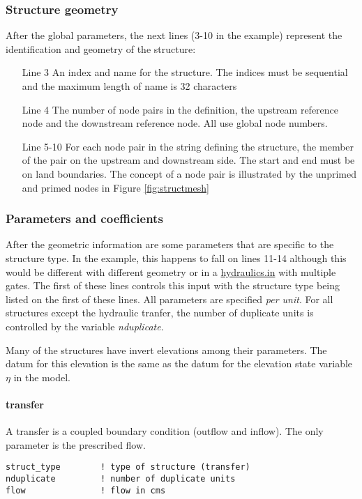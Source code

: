 \subsubsection{Structure geometry}
After the global parameters, the next lines (3-10 in the example) represent the identification and geometry of the structure:
\begin{enumerate}
\item [Line 3] An index and name for the structure. The indices must be sequential and the maximum length of name is 32 characters
\item [Line 4] The number of node pairs in the definition, the upstream reference node and the downstream reference node. All use global node numbers.
\item [Line 5-10] For each node pair in the string defining the structure, the member of the pair on the upstream and downstream side. 
The start and end must be on land boundaries. The concept of a node pair is illustrated by the unprimed and primed nodes in Figure \ref{fig:structmesh}
\end{enumerate}

\subsubsection{Parameters and coefficients}
\label{sec:gate_spec}
After the geometric information are some parameters that are specific to the structure type.
In the example, this happens to fall on lines 11-14 although this would be different with different geometry
or in a \url{hydraulics.in} with multiple gates.
The first of these lines controls this input with the structure type being listed on the first of these lines. 
All parameters are specified {\em per unit}. For all structures except the hydraulic tranfer, 
the number of duplicate units is controlled by the variable {\em nduplicate}. 

Many of the structures have invert elevations among their parameters. The datum for this elevation is the same
as the datum for the elevation state variable $\eta$ in the model.

\paragraph{transfer}
A transfer is a coupled boundary condition (outflow and inflow). The only parameter is the prescribed flow.
\begin{verbatim}
struct_type        ! type of structure (transfer)
nduplicate         ! number of duplicate units
flow               ! flow in cms
\end{verbatim}

